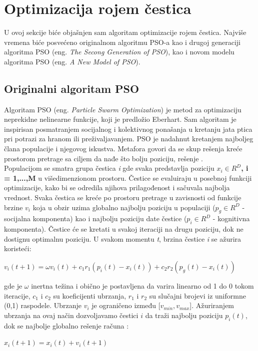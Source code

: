 \documentclass[a4paper]{article}
\begin{document}
\section{Optimizacija rojem čestica}
\label{subsec:pso}
U ovoj sekcije biće objašnjen sam algoritam optimizacije rojem čestica. Najviše vremena biće posvećeno originalnom algoritmu PSO-a
kao i drugoj generaciji algoritma PSO (eng. \textit{The Secong Generation of PSO}), kao i novom modelu algoritma PSO 
(eng. \textit{A New Model of PSO}).


\subsection{Originalni algoritam PSO}
\label{subsec:opso}
Algoritam PSO (eng. \textit{Particle Swarm Optimization}) je metod za optimizaciju neprekidne nelinearne funkcije, koji je predložio Eberhart.
Sam algoritam je inspirisan posmatranjem socijalnog i kolektivnog ponašanja u kretanju jata ptica pri potrazi za hranom ili preživaljavanjem.
PSO je nadahnut kretanjem najboljeg člana populacije i njegovog iskustva. Metafora govori da se skup rešenja kreće prostorom pretrage 
sa ciljem da nađe što bolju poziciju, rešenje \cite{hindawi}.
\\
Populacijom se smatra grupa čestica \textit{i} gde svaka predstavlja poziciju \textbf{\textbf{$x_i \in R^D$, i = 1,...,M}} u višedimenzionom prostoru.
Čestice se evaluiraju u posebnoj funkciji optimizacije, kako bi se odredila njihova prilagođenost i sačuvala najbolja vrednost. Svaka čestica se kreće po
prostoru pretrage u zavisnosti od funkcije brzine \textbf{$v_i$} koja u obzir uzima globalno najbolju poziciju u populaciji ($p_g \in R^D$ - socijalna
komponenta) kao i najbolju poziciju date čestice ($p_i \in R^D$ - kognitivna komponenta). Čestice će se kretati u svakoj iteraciji na drugu poziciju,
dok ne dostignu optimalnu poziciju. U svakom momentu \textit{t}, brzina čestice \textit{i} se ažurira koristeći: 
\begin{center}
\textbf\textit{$v_i(t+1) = \omega v_i(t) + c_1 r_1(p_i (t) - x_i (t)) + c_2 r_2 (p_g (t) - x_i (t))$}
\end{center}
gde je $\omega$ inertna težina i obično je postavljena da varira linearno od 1 do 0 tokom iteracije, $c_1$ i $c_2$ su koeficijenti ubrzanja, $r_1$ i $r_2$
su slučajni brojevi iz uniformne (0,1) raspodele. Ubrzanje \textbf{$v_i$} je ograničeno između [$v_{min}, v_{max}$]. Ažuriranjem ubrzanja na ovaj 
način dozvoljavamo čestici $i$ da traži najbolju poziciju \textbf{$p_i(t)$}, dok se najbolje globalno rešenje računa \cite{hindawi}:
\begin{center}
\textbf\textit{$x_i(t+1) = x_i(t) + v_i(t+1)$}
\end{center} 
\end{document}
